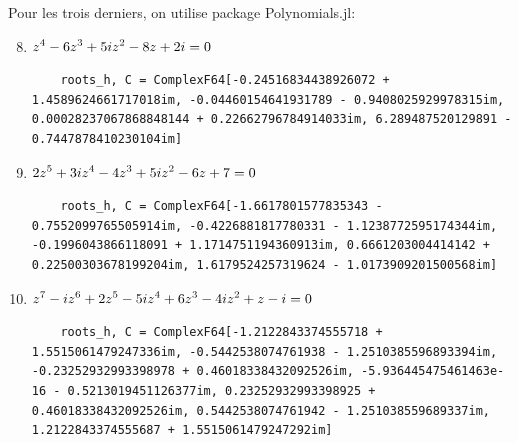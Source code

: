 \begin{solution}
    Pour les trois derniers, on utilise package Polynomials.jl:

    \begin{enumerate}[label=(\alph*)]
        \setcounter{enumi}{7}
        \item $\displaystyle z^4 - 6z^3 + 5iz^2 - 8z + 2i = 0$
        \begin{lstlisting}
    roots_h, C = ComplexF64[-0.24516834438926072 + 1.4589624661717018im, -0.04460154641931789 - 0.9408025929978315im, 0.00028237067868848144 + 0.22662796784914033im, 6.289487520129891 - 0.7447878410230104im]
        \end{lstlisting}        

        \item $\displaystyle 2z^5 + 3iz^4 - 4z^3 + 5iz^2 - 6z + 7 = 0$
        \begin{lstlisting}
    roots_h, C = ComplexF64[-1.6617801577835343 - 0.7552099765505914im, -0.4226881817780331 - 1.1238772595174344im, -0.1996043866118091 + 1.1714751194360913im, 0.6661203004414142 + 0.22500303678199204im, 1.6179524257319624 - 1.0173909201500568im]
        \end{lstlisting}

        \item $\displaystyle z^7 - iz^6 + 2z^5 - 5iz^4 + 6z^3 - 4iz^2 + z - i = 0$
        \begin{lstlisting}
    roots_h, C = ComplexF64[-1.2122843374555718 + 1.5515061479247336im, -0.5442538074761938 - 1.2510385596893394im, -0.23252932993398978 + 0.46018338432092526im, -5.936445475461463e-16 - 0.5213019451126377im, 0.23252932993398925 + 0.46018338432092526im, 0.5442538074761942 - 1.251038559689337im, 1.2122843374555687 + 1.5515061479247292im]
        \end{lstlisting}
    \end{enumerate}    
\end{solution}

